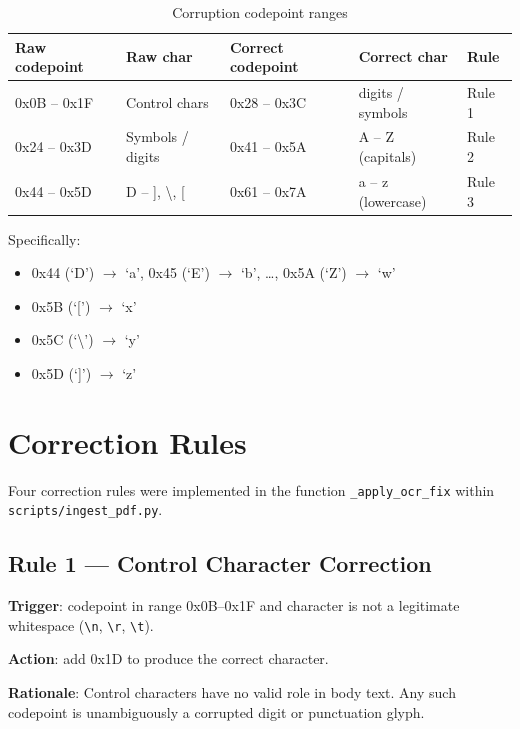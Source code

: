 \documentclass[12pt, a4paper]{report}
\newcommand{\codeinline}[1]{\texttt{#1}}
\begin{document}
\begin{table}[H]
  \centering
  \caption{Corruption codepoint ranges}
  \label{tab:corruption_ranges}
  \begin{tabular}{lllll}
    \toprule
    \textbf{Raw codepoint} & \textbf{Raw char} &
    \textbf{Correct codepoint} & \textbf{Correct char} & \textbf{Rule} \\
    \midrule
    0x0B -- 0x1F & Control chars & 0x28 -- 0x3C & digits / symbols & Rule 1 \\
    0x24 -- 0x3D & Symbols / digits & 0x41 -- 0x5A & A -- Z (capitals) & Rule 2 \\
    0x44 -- 0x5D & D -- ], \textbackslash, [ & 0x61 -- 0x7A & a -- z (lowercase) & Rule 3 \\
    \bottomrule
  \end{tabular}
\end{table}

Specifically:
\begin{itemize}[noitemsep]
  \item 0x44 (`D') $\to$ `a', \; 0x45 (`E') $\to$ `b', \ldots, 0x5A (`Z') $\to$ `w'
  \item 0x5B (`[') $\to$ `x'
  \item 0x5C (`\textbackslash') $\to$ `y'
  \item 0x5D (`]') $\to$ `z'
\end{itemize}

\section{Correction Rules}

Four correction rules were implemented in the function
\codeinline{\_apply\_ocr\_fix} within \codeinline{scripts/ingest\_pdf.py}.

\subsection{Rule 1 — Control Character Correction}

\textbf{Trigger}: codepoint in range 0x0B--0x1F and character is not a
legitimate whitespace (\codeinline{\textbackslash n}, \codeinline{\textbackslash r},
\codeinline{\textbackslash t}).

\textbf{Action}: add 0x1D to produce the correct character.

\textbf{Rationale}: Control characters have no valid role in body text.
Any such codepoint is unambiguously a corrupted digit or punctuation glyph.
\end{document}
